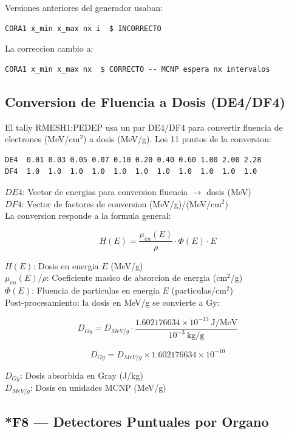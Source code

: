 \documentclass[12pt,a4paper]{article}
\newcommand{\vardef}[2]{\noindent\textbf{#1}: #2\\}
\begin{document}
Versiones anteriores del generador usaban:

\begin{verbatim}
CORA1 x_min x_max nx i  $ INCORRECTO
\end{verbatim}

La correccion cambio a:

\begin{verbatim}
CORA1 x_min x_max nx  $ CORRECTO -- MCNP espera nx intervalos
\end{verbatim}

\subsection{Conversion de Fluencia a Dosis (DE4/DF4)}

El tally RMESH1:PEDEP usa un par DE4/DF4 para convertir fluencia de electrones (MeV/cm$^2$) a dosis (MeV/g). Los 11 puntos de la conversion:

\begin{verbatim}
DE4  0.01 0.03 0.05 0.07 0.10 0.20 0.40 0.60 1.00 2.00 2.28
DF4  1.0  1.0  1.0  1.0  1.0  1.0  1.0  1.0  1.0  1.0  1.0
\end{verbatim}

\vardef{$DE4$}{Vector de energias para conversion fluencia $\to$ dosis (MeV)}
\vardef{$DF4$}{Vector de factores de conversion (MeV/g)/(MeV/cm$^2$)}

La conversion responde a la formula general:

$$
H(E) = \frac{\mu_{en}(E)}{\rho} \cdot \Phi(E) \cdot E
$$

\vardef{$H(E)$}{Dosis en energia $E$ (MeV/g)}
\vardef{$\mu_{en}(E)/\rho$}{Coeficiente masico de absorcion de energia (cm$^2$/g)}
\vardef{$\Phi(E)$}{Fluencia de particulas en energia $E$ (particulas/cm$^2$)}

Post-procesamiento: la dosis en MeV/g se convierte a Gy:

$$
D_{Gy} = D_{MeV/g} \cdot \frac{1.602176634 \times 10^{-13}\ \text{J/MeV}}{10^{-3}\ \text{kg/g}}
$$

$$
D_{Gy} = D_{MeV/g} \times 1.602176634 \times 10^{-10}
$$

\vardef{$D_{Gy}$}{Dosis absorbida en Gray (J/kg)}
\vardef{$D_{MeV/g}$}{Dosis en unidades MCNP (MeV/g)}

\subsection{*F8 --- Detectores Puntuales por Organo}
\end{document}
